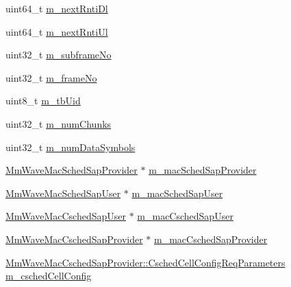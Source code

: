 \begin{DoxyCompactItemize}
\item 
uint64\+\_\+t \hyperlink{classns3_1_1MmWaveFlexTtiMaxWeightMacScheduler_aa8db6d3f0dc25a93232ce8549917acb4}{m\+\_\+next\+Rnti\+Dl}
\item 
uint64\+\_\+t \hyperlink{classns3_1_1MmWaveFlexTtiMaxWeightMacScheduler_a159790a3232b55023149b81270aadf3b}{m\+\_\+next\+Rnti\+Ul}
\item 
uint32\+\_\+t \hyperlink{classns3_1_1MmWaveFlexTtiMaxWeightMacScheduler_a4e60104c87be7e43a19e53a4a57be5eb}{m\+\_\+subframe\+No}
\item 
uint32\+\_\+t \hyperlink{classns3_1_1MmWaveFlexTtiMaxWeightMacScheduler_aa169cb1aa55307816c0e070c7c89fc83}{m\+\_\+frame\+No}
\item 
uint8\+\_\+t \hyperlink{classns3_1_1MmWaveFlexTtiMaxWeightMacScheduler_a2a101937392325023f902ec0b1baf5a7}{m\+\_\+tb\+Uid}
\item 
uint32\+\_\+t \hyperlink{classns3_1_1MmWaveFlexTtiMaxWeightMacScheduler_aee333012521004e3dedcb4f0ffb2ac29}{m\+\_\+num\+Chunks}
\item 
uint32\+\_\+t \hyperlink{classns3_1_1MmWaveFlexTtiMaxWeightMacScheduler_a91b4d63d7ba78c6a5f0462d6cc1b6fcc}{m\+\_\+num\+Data\+Symbols}
\item 
\hyperlink{classns3_1_1MmWaveMacSchedSapProvider}{Mm\+Wave\+Mac\+Sched\+Sap\+Provider} $\ast$ \hyperlink{classns3_1_1MmWaveFlexTtiMaxWeightMacScheduler_aaf239069e92039a7fc7c2d03d5901ec9}{m\+\_\+mac\+Sched\+Sap\+Provider}
\item 
\hyperlink{classns3_1_1MmWaveMacSchedSapUser}{Mm\+Wave\+Mac\+Sched\+Sap\+User} $\ast$ \hyperlink{classns3_1_1MmWaveFlexTtiMaxWeightMacScheduler_a4e443a317d7f5a4b2399043552cca5d5}{m\+\_\+mac\+Sched\+Sap\+User}
\item 
\hyperlink{classns3_1_1MmWaveMacCschedSapUser}{Mm\+Wave\+Mac\+Csched\+Sap\+User} $\ast$ \hyperlink{classns3_1_1MmWaveFlexTtiMaxWeightMacScheduler_aa7849b5ae01be4fff3fed35e521feb1d}{m\+\_\+mac\+Csched\+Sap\+User}
\item 
\hyperlink{classns3_1_1MmWaveMacCschedSapProvider}{Mm\+Wave\+Mac\+Csched\+Sap\+Provider} $\ast$ \hyperlink{classns3_1_1MmWaveFlexTtiMaxWeightMacScheduler_a02a4cec0c5f4930a0623239d887a4f4b}{m\+\_\+mac\+Csched\+Sap\+Provider}
\item 
\hyperlink{structns3_1_1MmWaveMacCschedSapProvider_1_1CschedCellConfigReqParameters}{Mm\+Wave\+Mac\+Csched\+Sap\+Provider\+::\+Csched\+Cell\+Config\+Req\+Parameters} \hyperlink{classns3_1_1MmWaveFlexTtiMaxWeightMacScheduler_ac07bfe66dc842f5edb8056fc80d7f329}{m\+\_\+csched\+Cell\+Config}

\end{DoxyCompactItemize}
